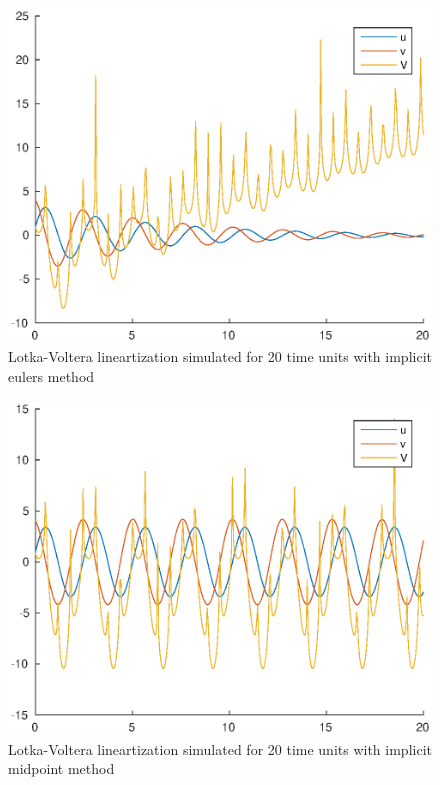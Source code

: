 \documentclass[11pt]{article}
\begin{document}
\begin{figure}[h]
\centering
\includegraphics[width=.8\textwidth]{LV_ieu.eps}
\caption{Lotka-Voltera lineartization simulated for 20 time units with implicit eulers method}
\label{fig:LV_ieu}
\end{figure}

\begin{figure}[h]
\centering
\includegraphics[width=.8\textwidth]{LV_imp.eps}
\caption{Lotka-Voltera lineartization simulated for 20 time units with implicit midpoint method}
\label{fig:LV_imp}
\end{figure}
\end{document}

